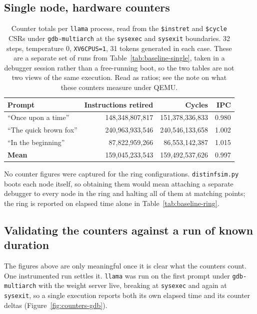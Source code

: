 \documentclass[11pt]{article}
\renewcommand{\_}{\origunderscore\allowbreak}
\begin{document}
\subsection*{Single node, hardware counters}

\begin{table}[H]
\centering
\small
\begin{tabular}{lrrr}
\toprule
\textbf{Prompt} & \textbf{Instructions retired} & \textbf{Cycles} & \textbf{IPC} \\
\midrule
``Once upon a time''    & 148{,}348{,}807{,}817 & 151{,}378{,}336{,}833 & 0.980 \\
``The quick brown fox'' & 240{,}963{,}933{,}546 & 240{,}546{,}133{,}658 & 1.002 \\
``In the beginning''    &  87{,}822{,}959{,}266 &  86{,}553{,}142{,}387 & 1.015 \\
\midrule
\textbf{Mean}           & 159{,}045{,}233{,}543 & 159{,}492{,}537{,}626 & 0.997 \\
\bottomrule
\end{tabular}
\caption{Counter totals per \texttt{llama} process, read from the \texttt{\$instret} and \texttt{\$cycle} CSRs under \texttt{gdb-multiarch} at the \texttt{sys\_exec} and \texttt{sys\_exit} boundaries. 32 steps, temperature 0, \texttt{XV6\_CPUS=1}, 31 tokens generated in each case. These are a separate set of runs from Table~\ref{tab:baseline-single}, taken in a debugger session rather than a free-running boot, so the two tables are not two views of the same execution. Read as ratios; see the note on what these counters measure under QEMU.}
\label{tab:baseline-counters}
\end{table}

No counter figures were captured for the ring configurations. \texttt{distinf\_sim.py} boots each node itself, so obtaining them would mean attaching a separate debugger to every node in the ring and halting all of them at matching points; the ring is reported on elapsed time alone in Table~\ref{tab:baseline-ring}.

\subsection*{Validating the counters against a run of known duration}

The figures above are only meaningful once it is clear what the counters count. One instrumented run settles it. \texttt{llama} was run on the first prompt under \texttt{gdb-multiarch} with the weight server live, breaking at \texttt{sys\_exec} and again at \texttt{sys\_exit}, so a single execution reports both its own elapsed time and its counter deltas (Figure~\ref{fig:counters-gdb}).
\end{document}
